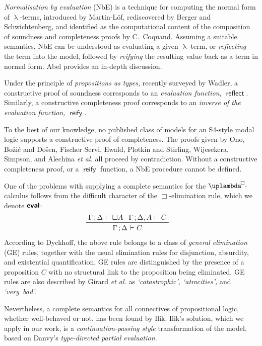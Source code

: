 \documentclass[submission,copyright,creativecommons,sharealike,backref=page]{eptcs}
\newcommand{\uplambdabox}{\uplambda^{\mkern-3mu\Box\mkern-3mu}}
\renewcommand{\:}{\mathop{\mkern3mu:\mkern3mu}}
\renewcommand{\.}{\mathop{\mkern3mu.\mkern3mu}}
\renewcommand{\;}{\mathop{;}}
\renewcommand{\,}{\mathop{,}}
\newcommand{\e}{\mathrel{\mkern2mu\vdash\mkern1mu}}
\newcommand{\reflect}{\operatorname{\textsf{reflect}}}
\newcommand{\reify}{\operatorname{\textsf{reify}}}
\newcommand{\eval}{\operatorname{\textsf{\textbf{eval}}}}
\theoremstyle{mystyle}
\begin{document}
\emph{Normalisation by evaluation} (NbE) is a technique for computing the normal form of $\uplambda$-terms, introduced by Martin-L{\"o}f\cite{MartinLof75}, rediscovered by Berger and Schwichtenberg\cite{BergerS91}, and identified as the computational content of the composition of soundness and completeness proofs by C.~Coquand\cite{Coquand93}.  Assuming a suitable semantics, NbE can be understood as evaluating a given $\uplambda$-term, or \emph{reflecting} the term into the model, followed by \emph{reifying} the resulting value back as a term in normal form.  Abel\cite{Abel13} provides an in-depth discussion.

Under the principle of \emph{propositions as types,} recently surveyed by Wadler\cite{Wadler15}, a constructive proof of soundness corresponds to an \emph{evaluation function,} $\reflect$.  Similarly, a constructive completeness proof corresponds to an \emph{inverse of the evaluation function,} $\reify$.

To the best of our knowledge, no published class of models for an S4-style modal logic supports a constructive proof of completeness.  The proofs given by Ono\cite{Ono77}, Bo\v{z}i\'{c} and Do\v{s}en\cite{BozicD84}, Fischer Servi\cite{FischerServi84}, Ewald\cite{Ewald86}, Plotkin and Stirling\cite{PlotkinS86}, Wijesekera\cite{Wijesekera90}, Simpson\cite{Simpson94}, and Alechina \emph{et al.}\cite{AlechinaMPR01} all proceed by contradiction.  Without a constructive completeness proof, or a $\reify$ function, a NbE procedure cannot be defined.

One of the problems with supplying a complete semantics for the $\uplambdabox$-calculus follows from the difficult character of the $\Box$-elimination rule, which we denote $\eval$:
\begin{align*}
  & \prftree
     {\Gamma \; \Delta \e \Box A}{\Gamma \; \Delta, A \e C}
     {\Gamma \; \Delta \e C}
\end{align*}
According to Dyckhoff\cite{Dyckhoff16}, the above rule belongs to a class of \emph{general elimination} (GE) rules, together with the usual elimination rules for disjunction, absurdity, and existential quantification.  GE rules are distinguished by the presence of a proposition $C$ with no structural link to the proposition being eliminated.  GE rules are also described by Girard \emph{et al.}\cite{GirardTL89} as \textsl{`catastrophic', `atrocities',} and \textsl{`very~bad'.}

Nevertheless, a complete semantics for all connectives of propositional logic, whether well-behaved or not, has been found by Ilik\cite{Ilik13}.  Ilik's solution, which we apply in our work, is a \emph{continuation-passing style} transformation of the model, based on Danvy's\cite{Danvy96} \emph{type-directed partial evaluation.}
\end{document}

